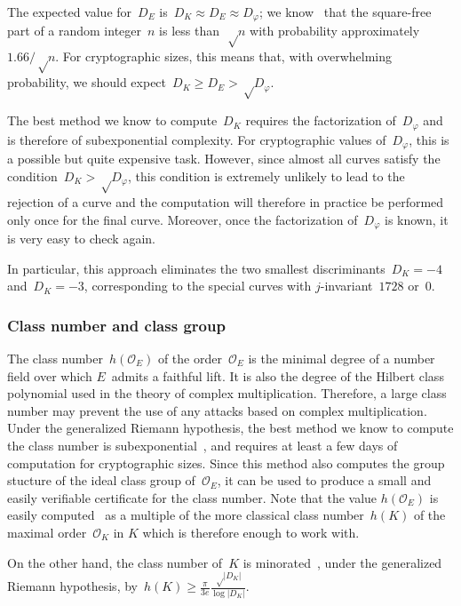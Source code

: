 \documentclass[twocolumn,letterpaper,10pt]{article}
\let\ro\mathcal
\def\abs#1{\left|#1\right|}
\def\pa#1{\left(#1\right)}
\begin{document}
The expected value for~$D_E$ is~$D_K ≈ D_E ≈ D_φ$;
we know~\cite{jis2014cdkd} that the square-free part of
a random integer~$n$ is less than~$√n$
with probability approximately~$1.66/√n$.
For cryptographic sizes, this means that,
with overwhelming probability, we should expect~$D_K \geq D_E > √{D_φ}$.

The best method we know to compute~$D_K$ requires the
factorization of~$D_φ$ and is therefore of subexponential complexity.
For cryptographic values of~$D_φ$, this is a possible but
quite expensive task.
However, since almost all curves satisfy the condition~$D_K > √{D_φ}$,
this condition is extremely unlikely to lead to the rejection of a curve
and the computation will therefore in practice be performed
only once for the final curve.
Moreover, once the factorization of~$D_φ$ is known,
it is very easy to check again.

In particular, this approach eliminates
the two smallest discriminants~$D_K = -4$ and~$D_K = -3$,
corresponding to the special curves with $j$-invariant~$1728$ or~$0$.

\subsubsection{Class number and class group}
\label{sss:class-group}

The class number~$h(\ro O_E)$ of the order~$\ro O_E$
is the minimal degree of a number field
over which $E$~admits a faithful lift.
It is also the degree of the Hilbert class polynomial
used in the theory of complex multiplication.
Therefore, a large class number may prevent the use
of any attacks based on complex multiplication.
Under the generalized Riemann hypothesis,
the best method we know to compute the class number
is subexponential~\cite{ams1989hmc,chile2009biasse},
and requires at least a few days of computation for cryptographic sizes.
Since this method also computes the group stucture
of the ideal class group of~$\ro O_E$,
it can be used to produce a small and easily verifiable certificate
for the class number.
Note that the value $h(\ro O_E)$ is easily computed~\cite[7.24]{cox1989primes}
as a multiple of the more classical class number~$h(K)$
of the maximal order~$\ro O_K$ in $K$
which is therefore enough to work with.

On the other hand,
the class number of~$K$ is minorated~\cite{cras1990louboutin},
under the generalized Riemann hypothesis,
by~$h(K) ≥ \frac{π}{3e} \frac{√{\abs{D_K}}}{\log \abs{D_K}}$.
\end{document}
